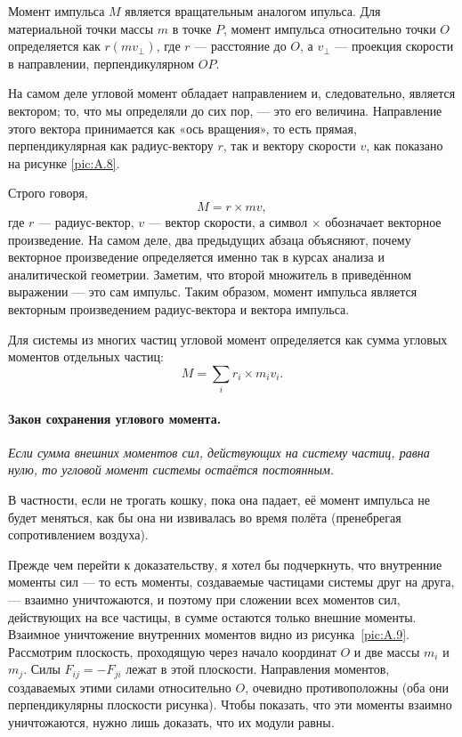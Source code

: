Момент импульса $M$ является вращательным аналогом
ипульса.
Для материальной точки массы $m$ в точке $P$, момент импульса относительно точки $O$ определяется как $r (m v_{\perp})$, где $r$ — расстояние до $O$, а $v_{\perp}$ — проекция скорости
в направлении, перпендикулярном $OP$.

На самом деле угловой момент обладает направлением и, следовательно, является вектором; то, что мы определяли до сих пор, — это его величина. Направление этого вектора принимается как «ось вращения», то есть прямая, перпендикулярная как радиус-вектору $r$, так и вектору скорости $v$, как показано на рисунке \ref{pic:A.8}.

Строго говоря,
\[M = r \times m v,\]
где $r$ — радиус-вектор, $v$ — вектор скорости, а символ $\times$ обозначает векторное произведение.
На самом деле, два предыдущих абзаца объясняют, почему векторное произведение определяется именно так в курсах анализа и аналитической геометрии.
Заметим, что второй множитель в приведённом выражении — это сам импульс.
Таким образом, момент импульса является векторным произведением радиус-вектора и вектора импульса.

Для системы из многих частиц угловой момент определяется как сумма угловых моментов отдельных частиц:
\begin{equation}
M = \sum_i r_i \times m_i v_i.
\label{eq:A.16}
\end{equation}

\paragraph{Закон сохранения углового момента.}
\emph{Если сумма внешних моментов сил, действующих на систему частиц, равна нулю, то угловой момент системы остаётся постоянным.}

В частности, если не трогать кошку, пока она падает, её момент импульса не будет меняться, как бы она ни извивалась во время полёта (пренебрегая сопротивлением воздуха).

Прежде чем перейти к доказательству, я хотел бы подчеркнуть, что
внутренние моменты сил — то есть моменты, создаваемые частицами системы друг на друга, — взаимно уничтожаются,
и поэтому при сложении всех моментов сил, действующих на все частицы, в сумме остаются только внешние моменты.
Взаимное уничтожение внутренних моментов видно из рисунка~\ref{pic:A.9}.
Рассмотрим плоскость, проходящую через начало координат $O$ и две массы $m_i$ и $m_j$.
Силы $F_{ij} = -F_{ji}$ лежат в этой плоскости.
Направления моментов, создаваемых этими силами относительно $O$, очевидно противоположны
(оба они перпендикулярны плоскости рисунка).
Чтобы показать, что эти моменты взаимно уничтожаются, нужно лишь доказать, что их модули равны.

